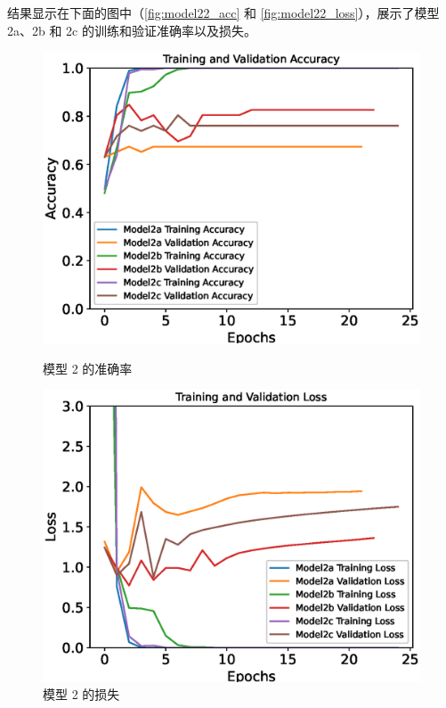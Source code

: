 结果显示在下面的图中（\autoref{fig:model22_acc} 和 \autoref{fig:model22_loss}），展示了模型 2a、2b 和 2c 的训练和验证准确率以及损失。
\begin{figure}
    \centering
    \begin{minipage}{0.49\textwidth}
        \centering
        \includegraphics[width=\textwidth]{./fig/model2/accuracy22.eps}
        \caption{模型 2 的准确率}
        \label{fig:model22_acc}
    \end{minipage}
    \begin{minipage}{0.49\textwidth}
        \centering
        \includegraphics[width=\textwidth]{./fig/model2/loss22.eps}
        \caption{模型 2 的损失}
        \label{fig:model22_loss}
    \end{minipage}
\end{figure}


